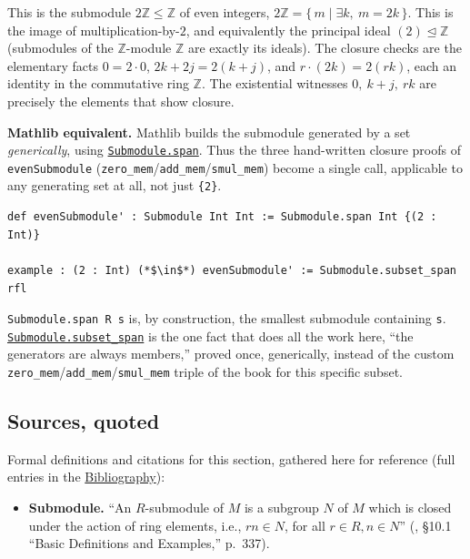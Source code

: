 \begin{mathreading}

This is the submodule \(2\mathbb{Z} \le \mathbb{Z}\) of even integers, \(2\mathbb{Z} = \{\, m \mid \exists k,\ m = 2k \,\}\). This is the image of multiplication-by-\(2\), and equivalently the principal ideal \((2)\trianglelefteq \mathbb{Z}\) (submodules of the \(\mathbb{Z}\)-module \(\mathbb{Z}\) are exactly its ideals). The closure checks are the elementary facts \(0 = 2\cdot 0\), \(2k + 2j = 2(k+j)\), and \(r\cdot(2k) = 2(rk)\), each an identity in the commutative ring \(\mathbb{Z}\). The existential witnesses \(0,\ k+j,\ rk\) are precisely the elements that show closure.

\end{mathreading}

\textbf{Mathlib equivalent.} Mathlib builds the submodule generated by a set \emph{generically}, using \href{https://loogle.lean-lang.org/?q=Submodule.span}{\texttt{Submodule.span}}. Thus the three hand-written closure proofs of \texttt{evenSubmodule} (\texttt{zero\_\allowbreak{}mem}/\texttt{add\_\allowbreak{}mem}/\texttt{smul\_\allowbreak{}mem}) become a single call, applicable to any generating set at all, not just \texttt{\{2\}}.

\begin{lstlisting}
def evenSubmodule' : Submodule Int Int := Submodule.span Int {(2 : Int)}

example : (2 : Int) (*$\in$*) evenSubmodule' := Submodule.subset_span rfl
\end{lstlisting}

\texttt{Submodule.span R s} is, by construction, the smallest submodule containing \texttt{s}. \href{https://loogle.lean-lang.org/?q=Submodule.subset_span}{\texttt{Submodule.subset\_\allowbreak{}span}} is the one fact that does all the work here, ``the generators are always members,'' proved once, generically, instead of the custom \texttt{zero\_\allowbreak{}mem}/\texttt{add\_\allowbreak{}mem}/\texttt{smul\_\allowbreak{}mem} triple of the book for this specific subset.

\subsection{Sources, quoted}\label{sec:10-modules:04-submodules:3}

Formal definitions and citations for this section, gathered here for reference (full entries in the \hyperref[sec:root:bibliography:1]{Bibliography}):

\begin{itemize}
\tightlist
\item
  \textbf{Submodule.} ``An \(R\)-submodule of \(M\) is a subgroup \(N\) of \(M\) which is closed under the action of ring elements, i.e., \(rn \in N\), for all \(r \in R, n \in N\)'' (\cite{DummitFoote2003}, §10.1 ``Basic Definitions and Examples,'' p.~337).
\end{itemize}
